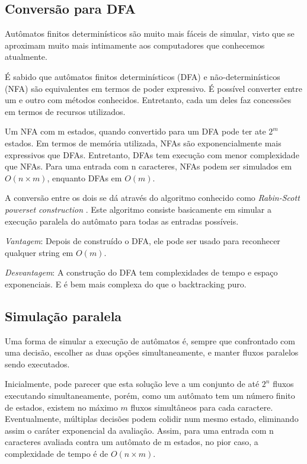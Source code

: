 \documentclass[a4paper,12pt,oneside,onecolumn]{uerj}
\begin{document}
\subsection{Conversão para DFA}

Autômatos finitos determinísticos são muito mais fáceis de simular, visto que se aproximam muito mais intimamente aos computadores que conhecemos atualmente. 

É sabido que autômatos finitos determinísticos (DFA) e não-determinísticos (NFA) são equivalentes em termos de poder expressivo. É possível converter entre um e outro com métodos conhecidos. Entretanto, cada um deles faz concessões em termos de recursos utilizados.

Um NFA com m estados, quando convertido para um DFA pode ter ate $2^m$ estados. Em termos de memória utilizada, NFAs são exponencialmente mais expressivos que DFAs. Entretanto, DFAs tem execução com menor complexidade que NFAs. Para uma entrada com n caracteres, NFAs podem ser simulados em $O(n \times m)$, enquanto DFAs em $O(m)$.

A conversão entre os dois se dá através do algoritmo conhecido como \emph{Rabin-Scott powerset construction} \cite{bib:Rabin59}. Este algoritmo consiste basicamente em simular a execução paralela do autômato para todas as entradas possíveis.

\emph{Vantagem}: Depois de construído o DFA, ele pode ser usado para reconhecer qualquer string em $O(m)$.

\emph{Desvantagem}: A construção do DFA tem complexidades de tempo e espaço exponenciais. E é bem mais complexa do que o backtracking puro.

\subsection{Simulação paralela}

Uma forma de simular a execução de autômatos é, sempre que confrontado com uma decisão, escolher as duas opções simultaneamente, e manter fluxos paralelos sendo executados. 

Inicialmente, pode parecer que esta solução leve a um conjunto de até $2^n$ fluxos executando simultaneamente, porém, como um autômato tem um número finito de estados, existem no máximo $m$ fluxos simultâneos para cada caractere. Eventualmente, múltiplas decisões podem colidir num mesmo estado, eliminando assim o caráter exponencial da avaliação. Assim, para uma entrada com n caracteres avaliada contra um autômato de m estados, no pior caso, a complexidade de tempo é de $O(n \times m)$.
\end{document}
